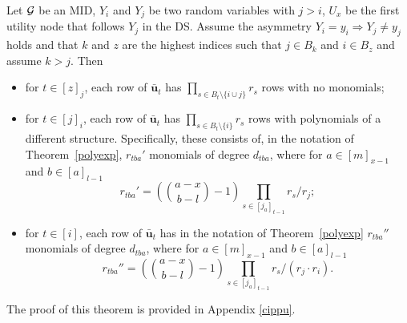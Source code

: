 \begin{theorem}
\label{polyasy}
Let $\mathcal{G}$ be an MID, $Y_i$ and $Y_j$ be two random variables with $j>i$, $U_x$ be the first utility node that follows $Y_j$ in the DS. Assume the asymmetry $Y_i=y_i\Rightarrow Y_j\neq y_j$ holds and that $k$ and $z$ are the highest indices such that $j\in B_k$ and $i\in B_z$ and assume  $k>j$. Then 
\begin{itemize}
\item for $t\in[z]_j$, each row of $\bar{\bm{u}}_t$ has $\prod_{s\in B_t\setminus \{i\cup j\}} r_s$ rows with no monomials;
\item for $t\in[j]_i$, each row of $\bar{\bm{u}}_t$ has $\prod_{s\in B_t\setminus \{i\}} r_s$ rows with polynomials of a different structure. Specifically, these consists of, in the notation of Theorem~\ref{polyexp}, $r_{tba}'$ monomials of degree $d_{tba}$, where for $a\in[m]_{x-1}$ and $b\in[a]_{l-1}$ 
\[
r_{tba}'=\left(\binom{a-x}{b-l}-1\right)\prod_{s\in[j_a]_{t-1}}r_s/r_j;
\]  
\item for $t\in[i]$, each row of $\bar{\bm{u}}_t$ has in the notation of Theorem~\ref{polyexp} $r_{tba}''$ monomials of degree $d_{tba}$, where for $a\in[m]_{x-1}$ and $b\in[a]_{l-1}$ 
\[
r_{tba}''=\left(\binom{a-x}{b-l}-1\right)\prod_{s\in[j_a]_{t-1}}r_s/(r_j\cdot r_i).
\]  
\end{itemize}

\end{theorem}
The proof of this theorem is provided in Appendix \ref{cippu}.
